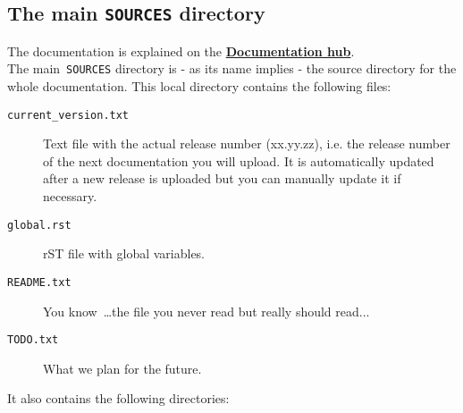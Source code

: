 \documentclass[a4paper,10pt]{article}
\newcommand{\code}[1]{\texttt{#1}}
\newcommand{\dhub}{{\bf Documentation hub}}
\begin{document}
\subsection{The main \code{SOURCES} directory}
\label{doc_content}

The documentation is explained on the \href{http://or-tools.googlecode.com/svn/trunk/documentation/documentation_hub.html}{\dhub}.\\

The main~\code{SOURCES} directory is - as its name implies - the source directory for the whole documentation.
This local directory contains the following files:

\begin{description}
 \item[\code{current\_version.txt}] Text file with the actual release number (xx.yy.zz), i.e. the release number of the next documentation you will upload. It is automatically updated after a new release is uploaded but you can manually update it
if necessary.
 \item[\code{global.rst}] rST file with global variables.
 \item[\code{README.txt}] You know~\ldots the file you never read but really should read...
 \item[\code{TODO.txt}] What we plan for the future.
\end{description}

It also contains the following directories:
\end{document}
